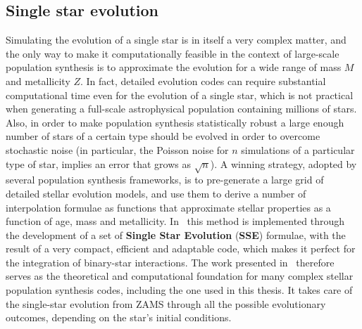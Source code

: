 \subsection{Single star evolution}
Simulating the evolution of a single star is in itself a very complex matter, and the only way to make it computationally feasible in the context of large-scale population synthesis is to approximate the evolution for a wide range of mass $M$ and metallicity $Z$. 
In fact, detailed evolution codes can require substantial computational time even for the evolution of a single star, which is not practical when generating a full-scale astrophysical population containing millions of stars. 
Also, in order to make population synthesis statistically robust a large enough number of stars of a certain type should be evolved in order to overcome stochastic noise (in particular, the Poisson noise for $n$ simulations of a particular type of star, implies an error that grows as $\sqrt{n}$).
A winning strategy, adopted by several population synthesis frameworks, is to pre-generate a large grid of detailed stellar evolution models, and use them to derive a number of interpolation formulae as functions that approximate stellar properties as a function of age, mass and metallicity. 
In~\cite{SSE} this method is implemented through the development of a set of \textbf{Single Star Evolution} (\textbf{SSE}) formulae, with the result of a very compact, efficient and adaptable code, which makes it perfect for the integration of binary-star interactions.
The work presented in~\cite{SSE} therefore serves as the theoretical and computational foundation for many complex stellar population synthesis codes, including the one used in this thesis. It takes care of the single-star evolution from ZAMS through all the possible evolutionary outcomes, depending on the star's initial conditions.

